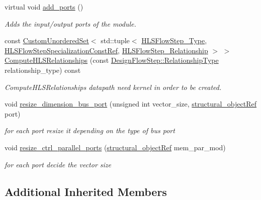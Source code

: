 \begin{DoxyCompactItemize}
virtual void \hyperlink{classdatapath__parallel__cs_af4ae83a9ee67fb9c5f2cdc6f7f5678a4}{add\+\_\+ports} ()
\begin{DoxyCompactList}\small\item\em Adds the input/output ports of the module. \end{DoxyCompactList}\item 
const \hyperlink{classCustomUnorderedSet}{Custom\+Unordered\+Set}$<$ std\+::tuple$<$ \hyperlink{hls__step_8hpp_ada16bc22905016180e26fc7e39537f8d}{H\+L\+S\+Flow\+Step\+\_\+\+Type}, \hyperlink{hls__step_8hpp_a5fdd2edf290c196531d21d68e13f0e74}{H\+L\+S\+Flow\+Step\+Specialization\+Const\+Ref}, \hyperlink{hls__step_8hpp_a3ad360b9b11e6bf0683d5562a0ceb169}{H\+L\+S\+Flow\+Step\+\_\+\+Relationship} $>$ $>$ \hyperlink{classdatapath__parallel__cs_a8ddd2d2e3b0f6b9d6ee635cb4a52beb7}{Compute\+H\+L\+S\+Relationships} (const \hyperlink{classDesignFlowStep_a723a3baf19ff2ceb77bc13e099d0b1b7}{Design\+Flow\+Step\+::\+Relationship\+Type} relationship\+\_\+type) const
\begin{DoxyCompactList}\small\item\em Compute\+H\+L\+S\+Relationships datapath need kernel in order to be created. \end{DoxyCompactList}\item 
void \hyperlink{classdatapath__parallel__cs_ae35b3e7cd2b03df2f26fa6a2a1c0ee97}{resize\+\_\+dimension\+\_\+bus\+\_\+port} (unsigned int vector\+\_\+size, \hyperlink{structural__objects_8hpp_a8ea5f8cc50ab8f4c31e2751074ff60b2}{structural\+\_\+object\+Ref} port)
\begin{DoxyCompactList}\small\item\em for each port resize it depending on the type of bus port \end{DoxyCompactList}\item 
void \hyperlink{classdatapath__parallel__cs_a242291d6433556127880f7baab96c641}{resize\+\_\+ctrl\+\_\+parallel\+\_\+ports} (\hyperlink{structural__objects_8hpp_a8ea5f8cc50ab8f4c31e2751074ff60b2}{structural\+\_\+object\+Ref} mem\+\_\+par\+\_\+mod)
\begin{DoxyCompactList}\small\item\em for each port decide the vector size \end{DoxyCompactList}\end{DoxyCompactItemize}
\subsection*{Additional Inherited Members}


